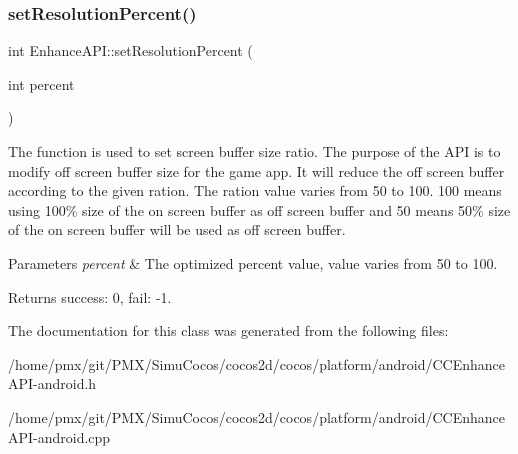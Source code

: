 \subsubsection{\texorpdfstring{set\+Resolution\+Percent()}{setResolutionPercent()}\hspace{0.1cm}{\footnotesize\ttfamily [2/2]}}
{\footnotesize\ttfamily int Enhance\+A\+P\+I\+::set\+Resolution\+Percent (\begin{DoxyParamCaption}\item[{int}]{percent }\end{DoxyParamCaption})\hspace{0.3cm}{\ttfamily [static]}}



The function is used to set screen buffer size ratio. The purpose of the A\+PI is to modify off screen buffer size for the game app. It will reduce the off screen buffer according to the given ration. The ration value varies from 50 to 100. 100 means using 100\% size of the on screen buffer as off screen buffer and 50 means 50\% size of the on screen buffer will be used as off screen buffer. 


\begin{DoxyParams}{Parameters}
{\em percent} & The optimized percent value, value varies from 50 to 100. \\
\hline
\end{DoxyParams}
\begin{DoxyReturn}{Returns}
success\+: 0, fail\+: -\/1. 
\end{DoxyReturn}


The documentation for this class was generated from the following files\+:\begin{DoxyCompactItemize}
\item 
/home/pmx/git/\+P\+M\+X/\+Simu\+Cocos/cocos2d/cocos/platform/android/C\+C\+Enhance\+A\+P\+I-\/android.\+h\item 
/home/pmx/git/\+P\+M\+X/\+Simu\+Cocos/cocos2d/cocos/platform/android/C\+C\+Enhance\+A\+P\+I-\/android.\+cpp\end{DoxyCompactItemize}
